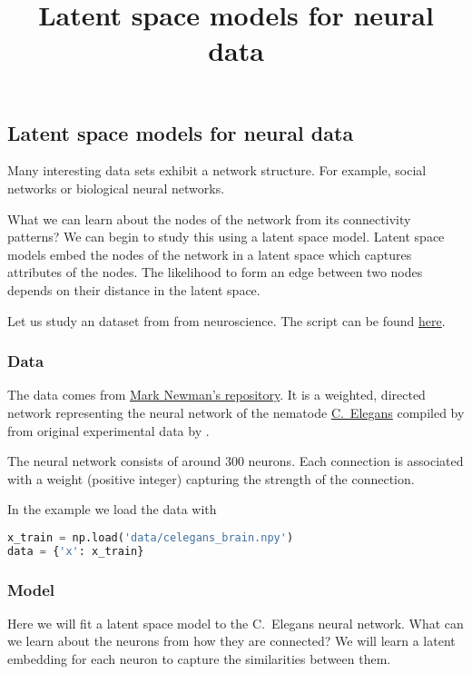 \title{Latent space models for neural data}

\subsection{Latent space models for neural data}

Many interesting data sets exhibit a network structure. For example, social
networks or biological neural networks.

What we can learn about the nodes of the network from its connectivity patterns?
We can begin to study this using a latent space model.
Latent space models embed the nodes of the network in a latent space which
captures attributes of the nodes. The likelihood to form an edge between two
nodes depends on their distance in the latent space.

Let us study an dataset from from neuroscience.
The script can be found
\href{https://github.com/blei-lab/edward/blob/master/examples/tf_latent_space_model.py}{here}.

\subsubsection{Data}

The data comes from \href{http://www-personal.umich.edu/~mejn/netdata/}{Mark Newman's repository}.
It is a weighted, directed network representing the neural network of
the nematode
\href{https://en.wikipedia.org/wiki/Caenorhabditis_elegans}{C.~Elegans}
compiled by \citet{watts1998collective} from original experimental data
by \citet{white1986structure}.

The neural network consists of around $300$ neurons. Each connection
is associated with a weight (positive integer) capturing the strength
of the connection.

In the example we load the data with
\begin{lstlisting}[language=Python]
x_train = np.load('data/celegans_brain.npy')
data = {'x': x_train}
\end{lstlisting}

\subsubsection{Model}

Here we will fit a latent space model
\citep{hoff2002latent} to the C.~Elegans neural network. What can
we learn about the neurons from how they are connected? We will learn a latent
embedding for each neuron to capture the similarities between them.

